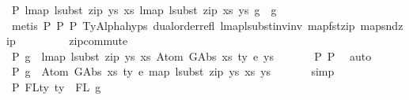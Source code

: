 \begin{isabellebody}
\ P{}{\isacharcolon}{\kern0pt}\ {\isachardoublequoteopen}lmap\ {\isacharparenleft}{\kern0pt}lsubst\ {\isacharparenleft}{\kern0pt}zip\ ys{\isacharprime}{\kern0pt}\ xs{\isacharprime}{\kern0pt}{\isacharparenright}{\kern0pt}{\isacharparenright}{\kern0pt}\ {\isacharparenleft}{\kern0pt}lmap\ {\isacharparenleft}{\kern0pt}lsubst\ {\isacharparenleft}{\kern0pt}zip\ xs{\isacharprime}{\kern0pt}\ ys{\isacharprime}{\kern0pt}{\isacharparenright}{\kern0pt}{\isacharparenright}{\kern0pt}\ g{\isacharparenright}{\kern0pt}\ {\isacharequal}{\kern0pt}\ g{\isachardoublequoteclose}\isanewline
\ \ \ \ \ \isamarkupfalse%
\ {\isacharparenleft}{\kern0pt}metis\ P{}\ P{}\ P{}\ TyAlpha{\isachardot}{\kern0pt}hyps{\isacharparenleft}{\kern0pt}{}{\isacharparenright}{\kern0pt}\ dual{\isacharunderscore}{\kern0pt}order{\isachardot}{\kern0pt}refl\ lmap{\isacharunderscore}{\kern0pt}lsubst{\isacharunderscore}{\kern0pt}inv{\isacharunderscore}{\kern0pt}inv\ map{\isacharunderscore}{\kern0pt}fst{\isacharunderscore}{\kern0pt}zip\ map{\isacharunderscore}{\kern0pt}snd{\isacharunderscore}{\kern0pt}zip\isanewline
\ \ \ \ \ \ \ \ \ zip{\isacharunderscore}{\kern0pt}commute{\isacharparenright}{\kern0pt}\isanewline
\ \ \isamarkupfalse%
\ P{}{\isacharcolon}{\kern0pt}\ {\isachardoublequoteopen}g\ {\isasymsimeq}\ lmap\ {\isacharparenleft}{\kern0pt}lsubst\ {\isacharparenleft}{\kern0pt}zip\ ys{\isacharprime}{\kern0pt}\ xs{\isacharprime}{\kern0pt}{\isacharparenright}{\kern0pt}{\isacharparenright}{\kern0pt}\ {\isacharparenleft}{\kern0pt}Atom\ {\isacharparenleft}{\kern0pt}GAbs\ xs\ ty{}\ e{\isacharparenright}{\kern0pt}\ ys{\isacharparenright}{\kern0pt}{\isachardoublequoteclose}\isanewline
\ \ \ \ \ \isamarkupfalse%
\ P{}\ P{}\ \isamarkupfalse%
\ auto\isanewline
\ \ \isamarkupfalse%
\ \isamarkupfalse%
\ P{}{\isacharcolon}{\kern0pt}\ {\isachardoublequoteopen}g\ {\isasymsimeq}\ Atom\ {\isacharparenleft}{\kern0pt}GAbs\ xs\ ty{}\ e{\isacharparenright}{\kern0pt}\ {\isacharparenleft}{\kern0pt}map\ {\isacharparenleft}{\kern0pt}lsubst\ {\isacharparenleft}{\kern0pt}zip\ ys{\isacharprime}{\kern0pt}\ xs{\isacharprime}{\kern0pt}{\isacharparenright}{\kern0pt}{\isacharparenright}{\kern0pt}\ ys{\isacharparenright}{\kern0pt}{\isachardoublequoteclose}\isanewline
\ \ \ \ \ \isamarkupfalse%
\ simp\isanewline
\isanewline
\isanewline
\ \ \isamarkupfalse%
\ P{}{}{\isacharcolon}{\kern0pt}\ {\isachardoublequoteopen}FLty\ ty{\isacharprime}{\kern0pt}\ {\isacharequal}{\kern0pt}\ FL\ g{\isachardoublequoteclose}\isanewline

\end{isabellebody}
